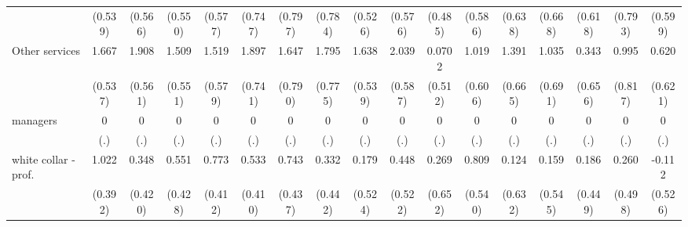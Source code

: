 {\begin{tabular}{l*{16}{c}}
                    &     (0.539)         &     (0.566)         &     (0.550)         &     (0.577)         &     (0.747)         &     (0.797)         &     (0.784)         &     (0.526)         &     (0.576)         &     (0.485)         &     (0.586)         &     (0.638)         &     (0.668)         &     (0.618)         &     (0.793)         &     (0.599)         \\
[1em]
Other services      &       1.667\sym{**} &       1.908\sym{***}&       1.509\sym{**} &       1.519\sym{**} &       1.897\sym{*}  &       1.647\sym{*}  &       1.795\sym{*}  &       1.638\sym{**} &       2.039\sym{***}&      0.0702         &       1.019         &       1.391\sym{*}  &       1.035         &       0.343         &       0.995         &       0.620         \\
                    &     (0.537)         &     (0.561)         &     (0.551)         &     (0.579)         &     (0.741)         &     (0.790)         &     (0.775)         &     (0.539)         &     (0.587)         &     (0.512)         &     (0.606)         &     (0.665)         &     (0.691)         &     (0.656)         &     (0.817)         &     (0.621)         \\
[1em]
managers            &           0         &           0         &           0         &           0         &           0         &           0         &           0         &           0         &           0         &           0         &           0         &           0         &           0         &           0         &           0         &           0         \\
                    &         (.)         &         (.)         &         (.)         &         (.)         &         (.)         &         (.)         &         (.)         &         (.)         &         (.)         &         (.)         &         (.)         &         (.)         &         (.)         &         (.)         &         (.)         &         (.)         \\
[1em]
white collar - prof.&       1.022\sym{**} &       0.348         &       0.551         &       0.773         &       0.533         &       0.743         &       0.332         &       0.179         &       0.448         &       0.269         &       0.809         &       0.124         &       0.159         &       0.186         &       0.260         &      -0.112         \\
                    &     (0.392)         &     (0.420)         &     (0.428)         &     (0.412)         &     (0.410)         &     (0.437)         &     (0.442)         &     (0.524)         &     (0.522)         &     (0.652)         &     (0.540)         &     (0.632)         &     (0.545)         &     (0.449)         &     (0.498)         &     (0.526)         \\

\end{tabular}}
